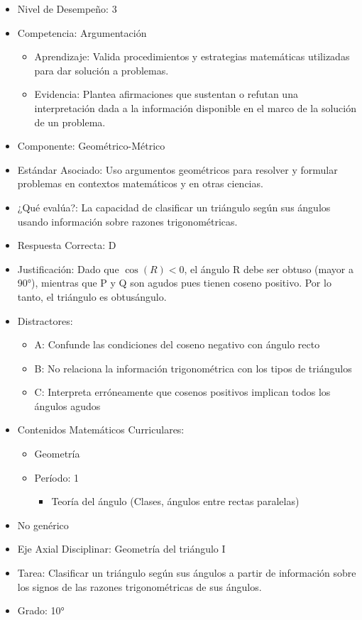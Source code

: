 \documentclass[
]{article}
\providecommand{\tightlist}{%
  \setlength{\itemsep}{0pt}\setlength{\parskip}{0pt}}
\begin{document}
\begin{itemize}
\tightlist
\item
  Nivel de Desempeño: 3
\item
  Competencia: Argumentación

  \begin{itemize}
  \tightlist
  \item
    Aprendizaje: Valida procedimientos y estrategias matemáticas
    utilizadas para dar solución a problemas.
  \item
    Evidencia: Plantea afirmaciones que sustentan o refutan una
    interpretación dada a la información disponible en el marco de la
    solución de un problema.
  \end{itemize}
\item
  Componente: Geométrico-Métrico
\item
  Estándar Asociado: Uso argumentos geométricos para resolver y formular
  problemas en contextos matemáticos y en otras ciencias.
\item
  ¿Qué evalúa?: La capacidad de clasificar un triángulo según sus
  ángulos usando información sobre razones trigonométricas.
\item
  Respuesta Correcta: D
\item
  Justificación: Dado que \(\cos(R) < 0\), el ángulo R debe ser obtuso
  (mayor a 90°), mientras que P y Q son agudos pues tienen coseno
  positivo. Por lo tanto, el triángulo es obtusángulo.
\item
  Distractores:

  \begin{itemize}
  \tightlist
  \item
    A: Confunde las condiciones del coseno negativo con ángulo recto
  \item
    B: No relaciona la información trigonométrica con los tipos de
    triángulos
  \item
    C: Interpreta erróneamente que cosenos positivos implican todos los
    ángulos agudos
  \end{itemize}
\item
  Contenidos Matemáticos Curriculares:

  \begin{itemize}
  \tightlist
  \item
    Geometría
  \item
    Período: 1

    \begin{itemize}
    \tightlist
    \item
      Teoría del ángulo (Clases, ángulos entre rectas paralelas)
    \end{itemize}
  \end{itemize}
\item
  No genérico
\item
  Eje Axial Disciplinar: Geometría del triángulo I
\item
  Tarea: Clasificar un triángulo según sus ángulos a partir de
  información sobre los signos de las razones trigonométricas de sus
  ángulos.
\item
  Grado: 10°
\end{itemize}
\end{document}
